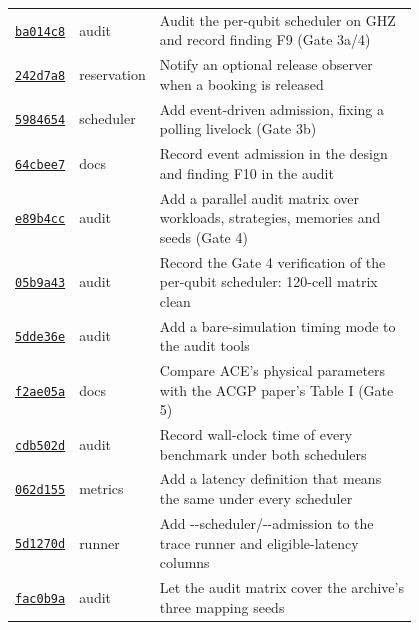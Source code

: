 {\begin{longtable}{@{}lp{0.12\linewidth}p{0.68\linewidth}@{}}
\href{https://github.com/sanjeevkrishnaa/Compiler-Driven-ACE/commit/ba014c8}{\texttt{ba014c8}} & audit & Audit the per-qubit scheduler on GHZ and record finding F9 (Gate 3a/4) \\
\href{https://github.com/sanjeevkrishnaa/Compiler-Driven-ACE/commit/242d7a8}{\texttt{242d7a8}} & reservation & Notify an optional release observer when a booking is released \\
\href{https://github.com/sanjeevkrishnaa/Compiler-Driven-ACE/commit/5984654}{\texttt{5984654}} & scheduler & Add event-driven admission, fixing a polling livelock (Gate 3b) \\
\href{https://github.com/sanjeevkrishnaa/Compiler-Driven-ACE/commit/64cbee7}{\texttt{64cbee7}} & docs & Record event admission in the design and finding F10 in the audit \\
\href{https://github.com/sanjeevkrishnaa/Compiler-Driven-ACE/commit/e89b4cc}{\texttt{e89b4cc}} & audit & Add a parallel audit matrix over workloads, strategies, memories and seeds (Gate 4) \\
\href{https://github.com/sanjeevkrishnaa/Compiler-Driven-ACE/commit/05b9a43}{\texttt{05b9a43}} & audit & Record the Gate 4 verification of the per-qubit scheduler: 120-cell matrix clean \\
\href{https://github.com/sanjeevkrishnaa/Compiler-Driven-ACE/commit/5dde36e}{\texttt{5dde36e}} & audit & Add a bare-simulation timing mode to the audit tools \\
\href{https://github.com/sanjeevkrishnaa/Compiler-Driven-ACE/commit/f2ae05a}{\texttt{f2ae05a}} & docs & Compare ACE's physical parameters with the ACGP paper's Table I (Gate 5) \\
\href{https://github.com/sanjeevkrishnaa/Compiler-Driven-ACE/commit/cdb502d}{\texttt{cdb502d}} & audit & Record wall-clock time of every benchmark under both schedulers \\
\href{https://github.com/sanjeevkrishnaa/Compiler-Driven-ACE/commit/062d155}{\texttt{062d155}} & metrics & Add a latency definition that means the same under every scheduler \\
\href{https://github.com/sanjeevkrishnaa/Compiler-Driven-ACE/commit/5d1270d}{\texttt{5d1270d}} & runner & Add -{}-scheduler/-{}-admission to the trace runner and eligible-latency columns \\
\href{https://github.com/sanjeevkrishnaa/Compiler-Driven-ACE/commit/fac0b9a}{\texttt{fac0b9a}} & audit & Let the audit matrix cover the archive's three mapping seeds \\

\end{longtable}}
